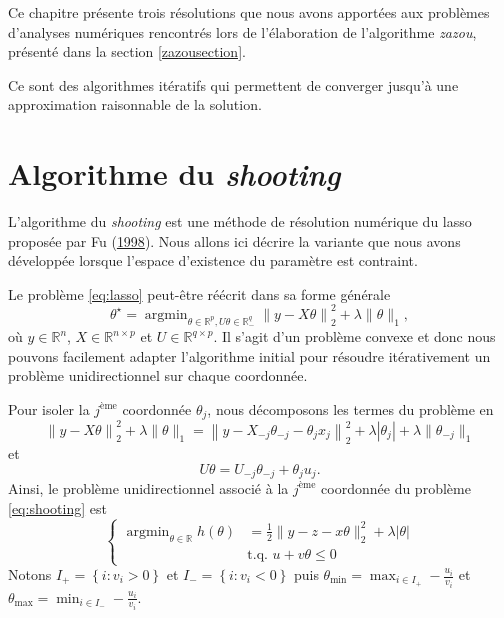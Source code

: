 \documentclass[12pt,a4paper]{reedthesis}
\newcommand \RR {\mathbb{R}}
\newcommand \param {\theta}
\DeclareMathOperator*{\argmin}{argmin}
\theoremstyle{definition}
\theoremstyle{definition}
\theoremstyle{definition}
\theoremstyle{remark}
\begin{document}
Ce chapitre présente trois résolutions que nous avons apportées aux problèmes d'analyses numériques rencontrés lors de l'élaboration de l'algorithme \emph{zazou}, présenté dans la section \ref{zazousection}.

Ce sont des algorithmes itératifs qui permettent de converger jusqu'à une approximation raisonnable de la solution.

\hypertarget{shooting}{%
\section{\texorpdfstring{Algorithme du \emph{shooting}}{Algorithme du shooting}}\label{shooting}}

L'algorithme du \emph{shooting} est une méthode de résolution numérique du lasso proposée par Fu (\protect\hyperlink{ref-fu1998penalized}{1998}). Nous allons ici décrire la variante que nous avons développée lorsque l'espace d'existence du paramètre est contraint.

Le problème \eqref{eq:lasso} peut-être réécrit dans sa forme générale
\begin{equation}
\label{eq:shooting}
\param^\star = \argmin_{\param \in \RR^p,U\param \in \RR^q_{-}} \left\|y - X\param\right\|_2^2 + \lambda \|\param\|_1,
\end{equation}
où \(y \in \RR^n\), \(X \in \RR^{n\times p}\) et \(U \in \RR^{q \times p}\). Il s'agit d'un problème convexe et donc nous pouvons facilement adapter l'algorithme initial pour résoudre itérativement un problème unidirectionnel sur chaque coordonnée.

Pour isoler la \(j^{\text{ème}}\) coordonnée \(\param_j\), nous décomposons les termes du problème en\\
\begin{equation*}
\left\|y - X\param\right\|_2^2 + \lambda \|\param\|_1 = \left\|y - X_{-j}\param_{-j} - \param_j x_j\right\|_2^2 + \lambda |\param_j| + \lambda \|\param_{-j}\|_1
\end{equation*}
et
\begin{equation*}
U\param = U_{-j}\param_{-j} + \param_j u_j.
\end{equation*}
Ainsi, le problème unidirectionnel associé à la \(j^{\text{ème}}\) coordonnée du problème \eqref{eq:shooting} est
\begin{equation}
\label{eq:unidirectionnel}
\left\{
  \begin{aligned}
    \argmin_{\param \in \RR} h(\param) & = \frac{1}{2} \|y - z - x\param\|^2_2 + \lambda |\param| \\
    & \text{t.q. } u + v\param \leq 0
  \end{aligned}
\right.
\end{equation}
Notons \(I_+ = \left\{ i : v_i > 0 \right\}\) et \(I_- = \left\{i : v_i < 0 \right\}\) puis \(\param_{\min} = \max_{i \in I_+} -\frac{u_i}{v_i}\) et \(\param_{\max} = \min_{i \in I_-} -\frac{u_i}{v_i}\).
\end{document}
